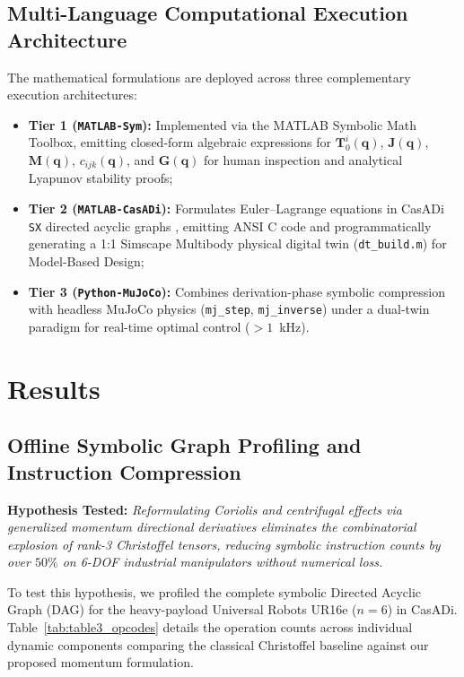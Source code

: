\documentclass[fleqn,10pt]{article}
\begin{document}
	\subsection*{Multi-Language Computational Execution Architecture}
	
	The mathematical formulations are deployed across three complementary execution architectures:
	\begin{itemize}
		\item \textbf{Tier 1 (\texttt{MATLAB-Sym}):} Implemented via the MATLAB Symbolic Math Toolbox, emitting closed-form algebraic expressions for $\bm{T}_0^i(\bm{q})$, $\bm{J}(\bm{q})$, $\bm{M}(\bm{q})$, $c_{ijk}(\bm{q})$, and $\bm{G}(\bm{q})$ for human inspection and analytical Lyapunov stability proofs;
		\item \textbf{Tier 2 (\texttt{MATLAB-CasADi}):} Formulates Euler--Lagrange equations in CasADi \texttt{SX} directed acyclic graphs \cite{andersson2019casadi}, emitting ANSI C code and programmatically generating a 1:1 Simscape Multibody physical digital twin (\texttt{dt\_build.m}) for Model-Based Design;
		\item \textbf{Tier 3 (\texttt{Python-MuJoCo}):} Combines derivation-phase symbolic compression with headless MuJoCo physics (\texttt{mj\_step}, \texttt{mj\_inverse}) \cite{todorov2012mujoco} under a dual-twin paradigm for real-time optimal control ($>1$~kHz).
	\end{itemize}
	
	\section*{Results}
	
	\subsection*{Offline Symbolic Graph Profiling and Instruction Compression}
	
	\noindent\textbf{Hypothesis Tested:} \textit{Reformulating Coriolis and centrifugal effects via generalized momentum directional derivatives eliminates the combinatorial explosion of rank-3 Christoffel tensors, reducing symbolic instruction counts by over $50\%$ on 6-DOF industrial manipulators without numerical loss.}
	
	To test this hypothesis, we profiled the complete symbolic Directed Acyclic Graph (DAG) for the heavy-payload Universal Robots UR16e ($n=6$) in CasADi. Table~\ref{tab:table3_opcodes} details the operation counts across individual dynamic components comparing the classical Christoffel baseline against our proposed momentum formulation.
	
\end{document}
